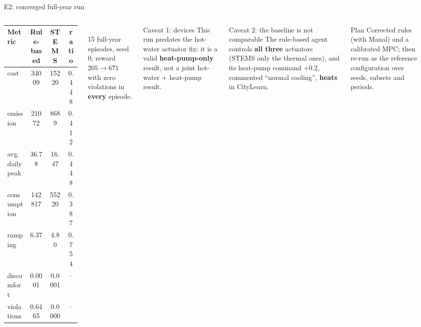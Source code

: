 \documentclass[aspectratio=169,10pt]{beamer}
\begin{document}
\begin{frame}{E2: converged full-year run}
\small
\begin{columns}[T]
\scriptsize
\begin{tabular}{@{}lccc@{}}
\toprule
Metric & Rule-based & STEMS & ratio \\
\midrule
cost & 34009 & 15220 & 0.448 \\
emission & 21072 & 8689 & 0.412 \\
avg.\ daily peak & 36.78 & 16.47 & 0.448 \\
consumption & 142817 & 55220 & 0.387 \\
ramping & 6.37 & 4.80 & 0.754 \\
discomfort & 0.0001 & 0.0001 & -- \\
violations & 0.6465 & 0.0000 & -- \\
\bottomrule
\end{tabular}\\[4pt]
15 full-year episodes, seed 0; reward $205 \rightarrow 671$ with zero violations in \textbf{every} episode.
\begin{alertblock}{Caveat 1: devices}
This run predates the hot-water actuator fix: it is a valid \textbf{heat-pump-only} result, not a joint hot-water + heat-pump result.
\end{alertblock}
\begin{alertblock}{Caveat 2: the baseline is not comparable}
The rule-based agent controls \textbf{all three} actuators (STEMS only the thermal ones), and its heat-pump command $+0.2$, commented ``normal cooling'', \textbf{heats} in CityLearn.
\end{alertblock}
\begin{block}{Plan}
Corrected rules (with Manal) and a calibrated MPC; then re-run as the reference configuration over seeds, subsets and periods.
\end{block}
\end{columns}
\end{frame}
\end{document}
